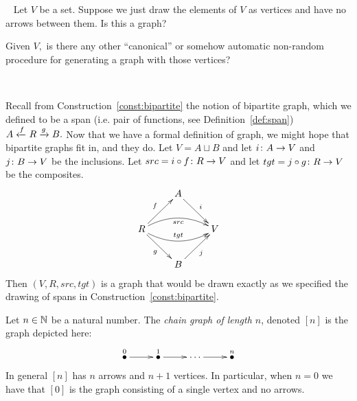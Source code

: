 \documentclass[../main/CT4S-EN-RU]{subfiles}
\begin{document}
\begin{exerciseRUS}
\end{exerciseRUS}

\begin{exerciseENG}~
\sexc Let $V$ be a set. Suppose we just draw the elements of $V$ as vertices and have no arrows between them. Is this a graph?
\item Given $V,$ is there any other “canonical” or somehow automatic non-random procedure for generating a graph with those vertices? 
\endsexc
\end{exerciseENG}

\begin{exerciseRUS}~
\end{exerciseRUS}

\begin{exampleENG}
Recall from Construction~\ref{const:bipartite} the notion of bipartite graph, which we defined to be a span (i.e. pair of functions, see Definition~\ref{def:span}) $A\xleftarrow{f}R\xrightarrow{g}B.$ Now that we have a formal definition of graph, we might hope that bipartite graphs fit in, and they do. Let $V=A\sqcup B$ and let $i\colon A\rightarrow V$ and $j\colon B\rightarrow V$ be the inclusions. Let $src=i\circ f\colon R\rightarrow V$ and let $tgt=j\circ g\colon R\rightarrow V$ be the composites.
$$
\xymatrix{&A\ar[dr]^i\\R\ar@/^1pc/[rr]_{src}\ar@/_1pc/[rr]^{tgt}\ar[ur]^f\ar[dr]_g&&V\\&B\ar[ur]_j}
$$ 
Then $(V,R,src,tgt)$ is a graph that would be drawn exactly as we specified the drawing of spans in Construction~\ref{const:bipartite}.
\end{exampleENG}

\begin{exampleRUS}
\end{exampleRUS}

\begin{exampleENG}\label{ex:[n] as graph}
Let $n\in{\mathbb N}$ be a natural number. The {\em chain graph of length $n$}, denoted $[n]$ is the graph depicted here:
$$
\xymatrix{
\LMO{0}\ar[r]&\LMO{1}\ar[r]&\cdots\ar[r]&\LMO{n}
}
$$
In general $[n]$ has $n$ arrows and $n+1$ vertices. In particular, when $n=0$ we have that $[0]$ is the graph consisting of a single vertex and no arrows. 
\end{exampleENG}

\begin{exampleRUS}\label{ex:[n] as graph}
\end{exampleRUS}
\end{document}
